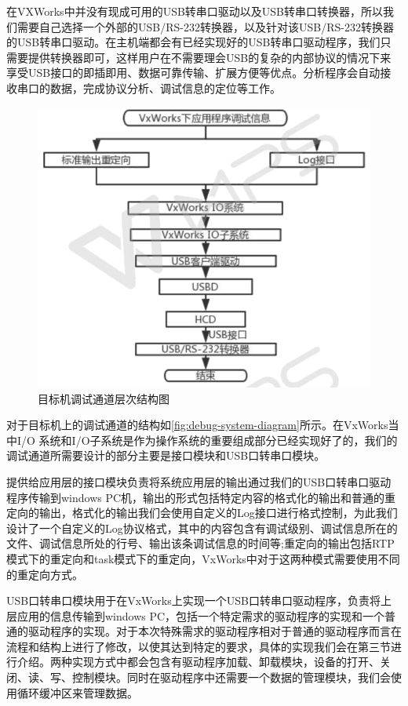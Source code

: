 	在VXWorks中并没有现成可用的USB转串口驱动以及USB转串口转换器，所以我们需要自己选择一个外部的USB/RS-232转换器，以及针对该USB/RS-232转换器的USB转串口驱动。在主机端都会有已经实现好的USB转串口驱动程序，我们只需要提供转换器即可，这样用户在不需要理会USB的复杂的内部协议的情况下来享受USB接口的即插即用、数据可靠传输、扩展方便等优点。分析程序会自动接收串口的数据，完成协议分析、调试信息的定位等工作。
\begin{figure}[!h]
\centering
\includegraphics[width=1.0\textwidth]{./graphics/debug-system-diagram.pdf}
\caption{目标机调试通道层次结构图}\label{fig:debug-system-diagram}
\end{figure}
	
	对于目标机上的调试通道的结构如\autoref{fig:debug-system-diagram}所示。在VxWorks当中I/O 系统和I/O子系统是作为操作系统的重要组成部分已经实现好了的，我们的调试通道所需要设计的部分主要是接口模块和USB口转串口模块。
	
	提供给应用层的接口模块负责将系统应用层的输出通过我们的USB口转串口驱动程序传输到windows PC机，输出的形式包括特定内容的格式化的输出和普通的重定向的输出，格式化的输出我们会使用自定义的Log接口进行格式控制，为此我们设计了一个自定义的Log协议格式，其中的内容包含有调试级别、调试信息所在的文件、调试信息所处的行号、输出该条调试信息的时间等;重定向的输出包括RTP模式下的重定向和task模式下的重定向，VxWorks中对于这两种模式需要使用不同的重定向方式。
	
	USB口转串口模块用于在VxWorks上实现一个USB口转串口驱动程序，负责将上层应用的信息传输到windows PC，包括一个特定需求的驱动程序的实现和一个普通的驱动程序的实现。对于本次特殊需求的驱动程序相对于普通的驱动程序而言在流程和结构上进行了修改，以使其达到特定的要求，具体的实现我们会在第三节进行介绍。两种实现方式中都会包含有驱动程序加载、卸载模块，设备的打开、关闭、读、写、控制模块。同时在驱动程序中还需要一个数据的管理模块，我们会使用循环缓冲区来管理数据。



